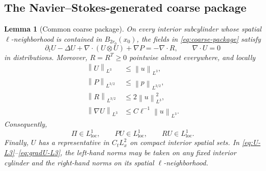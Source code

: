 \documentclass[10pt,a4paper]{amsart}
\numberwithin{equation}{section}
\newtheorem{lemma}[theorem]{Lemma}
\newcommand{\norm}[2]{\left\lVert #1\right\rVert_{#2}}
\begin{document}
\subsection{The Navier--Stokes-generated coarse package}\label{sec:package}

\begin{lemma}[Common coarse package]\label{lem:coarse-package}
On every interior subcylinder whose spatial \(\ell\)-neighborhood is contained in \(B_{2r_0}(x_0)\), the fields in \eqref{eq:coarse-package} satisfy
\begin{equation}\label{eq:coarse-momentum}
\partial_tU-\Delta U+\nabla\cdot(U\otimes U)+\nabla P
=-\nabla\cdot R,
\qquad
\nabla\cdot U=0
\end{equation}
in distributions. Moreover, \(R=R^T\ge0\) pointwise almost everywhere, and locally
\begin{align}
\norm{U}{L^3}&\le\norm{u}{L^3},
\label{eq:U-L3}
\\
\norm{P}{L^{3/2}}&\le\norm{p}{L^{3/2}},
\label{eq:P-L32}
\\
\norm{R}{L^{3/2}}&\le2\norm{u}{L^3}^2,
\label{eq:R-L32}
\\
\norm{\nabla U}{L^3}&\le C\ell^{-1}\norm{u}{L^3}.
\label{eq:gradU-L3}
\end{align}
Consequently,
\begin{equation}\label{eq:Pi-L1}
\Pi\in L^1_{\mathrm{loc}},
\qquad
PU\in L^1_{\mathrm{loc}},
\qquad
RU\in L^1_{\mathrm{loc}}.
\end{equation}
Finally, \(U\) has a representative in \(C_tL^2_x\) on compact interior spatial sets. In \eqref{eq:U-L3}--\eqref{eq:gradU-L3}, the left-hand norms may be taken on any fixed interior cylinder and the right-hand norms on its spatial \(\ell\)-neighborhood.
\end{lemma}
\end{document}
